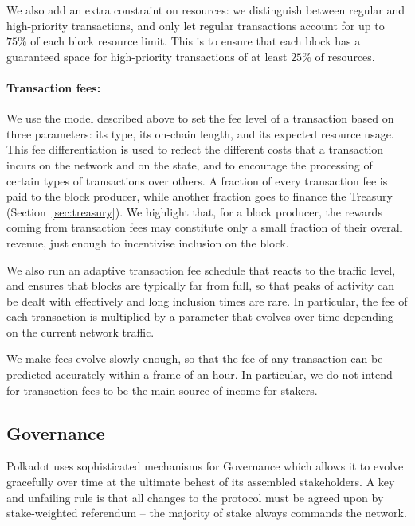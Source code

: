 \documentclass{article}
\begin{document}
We also add an extra constraint on resources: we distinguish between regular and high-priority transactions, and only let regular transactions account for up to $75\%$ of each block resource limit. This is to ensure that each block has a guaranteed space for high-priority transactions of at least $25\%$ of resources.

\paragraph{Transaction fees:} We use the model described above to set the fee level of a transaction based on three parameters: its type, its on-chain length, and its expected resource usage. This fee differentiation is used to reflect the different costs that a transaction incurs on the network and on the state, and to encourage the processing of certain types of transactions over others. A fraction of every transaction fee is paid to the block producer, while another fraction goes to finance the Treasury (Section~\ref{sec:treasury}). We highlight that, for a block producer, the rewards coming from transaction fees may constitute only a small fraction of their overall revenue, just enough to incentivise inclusion on the block.

We also run an adaptive transaction fee schedule that reacts to the traffic level, and ensures that blocks are typically far from full, so that peaks of activity can be dealt with effectively and long inclusion times are rare. In particular, the fee of each transaction is multiplied by a parameter that evolves over time depending on the current network traffic. 



We make fees evolve slowly enough, so that the fee of any transaction can be predicted accurately within a frame of an hour. In particular, we do not intend for transaction fees to be the main source of income for stakers.




\subsection{Governance}\label{sec:governance}

Polkadot uses sophisticated mechanisms for Governance which allows it to evolve gracefully over time at the ultimate behest of its assembled stakeholders. A key and unfailing rule is that all changes to the protocol must be agreed upon by stake-weighted referendum -- the majority of stake always commands the network.
\end{document}
